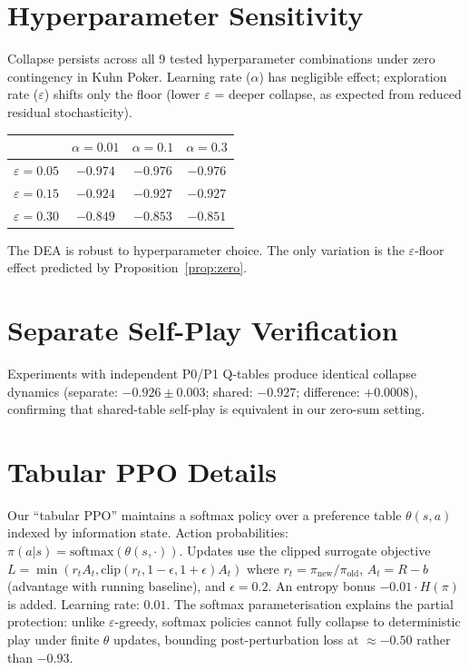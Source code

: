 \documentclass{article}
\begin{document}



\clearpage
\appendix

\section{Hyperparameter Sensitivity}
\label{app:hyperparam}
Collapse persists across all 9 tested hyperparameter combinations under zero contingency in Kuhn Poker. Learning rate ($\alpha$) has negligible effect; exploration rate ($\varepsilon$) shifts only the floor (lower $\varepsilon$ = deeper collapse, as expected from reduced residual stochasticity).

\begin{center}
\begin{tabular}{lccc}
\toprule
 & $\alpha = 0.01$ & $\alpha = 0.1$ & $\alpha = 0.3$ \\
\midrule
$\varepsilon = 0.05$ & $-0.974$ & $-0.976$ & $-0.976$ \\
$\varepsilon = 0.15$ & $-0.924$ & $-0.927$ & $-0.927$ \\
$\varepsilon = 0.30$ & $-0.849$ & $-0.853$ & $-0.851$ \\
\bottomrule
\end{tabular}
\end{center}

The DEA is robust to hyperparameter choice. The only variation is the $\varepsilon$-floor effect predicted by Proposition~\ref{prop:zero}.

\section{Separate Self-Play Verification}
\label{app:separate}
Experiments with independent P0/P1 Q-tables produce identical collapse dynamics (separate: $-0.926 \pm 0.003$; shared: $-0.927$; difference: $+0.0008$), confirming that shared-table self-play is equivalent in our zero-sum setting.

\section{Tabular PPO Details}
\label{app:ppo}
Our ``tabular PPO'' maintains a softmax policy over a preference table $\theta(s, a)$ indexed by information state. Action probabilities: $\pi(a|s) = \text{softmax}(\theta(s, \cdot))$. Updates use the clipped surrogate objective $L = \min(r_t A_t, \text{clip}(r_t, 1-\epsilon, 1+\epsilon) A_t)$ where $r_t = \pi_{\text{new}} / \pi_{\text{old}}$, $A_t = R - b$ (advantage with running baseline), and $\epsilon = 0.2$. An entropy bonus $-0.01 \cdot H(\pi)$ is added. Learning rate: $0.01$. The softmax parameterisation explains the partial protection: unlike $\varepsilon$-greedy, softmax policies cannot fully collapse to deterministic play under finite $\theta$ updates, bounding post-perturbation loss at $\approx -0.50$ rather than $-0.93$.
\end{document}
